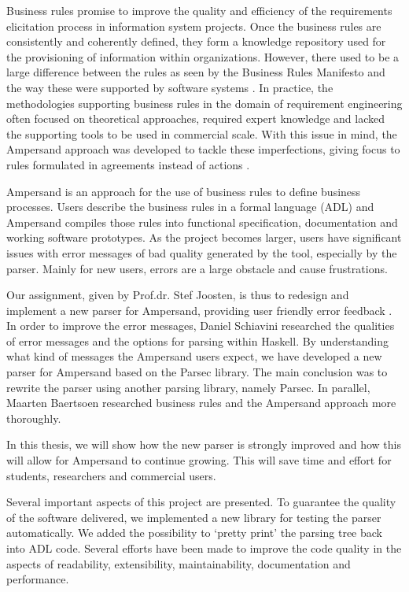 
Business rules promise to improve the quality and efficiency of the requirements elicitation process in information system projects.
Once the business rules are consistently and coherently defined, they form a knowledge repository used for the provisioning of information within organizations.
However, there used to be a large difference between the rules as seen by the Business Rules Manifesto and the way these were supported by software systems .
In practice, the methodologies supporting business rules in the domain of requirement engineering often focused on theoretical approaches, required expert knowledge and lacked the supporting tools to be used in commercial scale.
With this issue in mind, the Ampersand approach was developed to tackle these imperfections, giving focus to rules formulated in agreements instead of actions .

Ampersand is an approach for the use of business rules to define business processes.
Users describe the business rules in a formal language (ADL) and Ampersand compiles those rules into functional specification, documentation and working software prototypes.
As the project becomes larger, users have significant issues with error messages of bad quality generated by the tool, especially by the parser.
Mainly for new users, errors are a large obstacle and cause frustrations.

Our assignment, given by Prof.dr. Stef Joosten, is thus to redesign and implement a new parser for Ampersand, providing user friendly error feedback .
In order to improve the error messages, Daniel Schiavini researched the qualities of error messages and the options for parsing within Haskell.
By understanding what kind of messages the Ampersand users expect, we have developed a new parser for Ampersand based on the Parsec library.
The main conclusion was to rewrite the parser using another parsing library, namely Parsec.
In parallel, Maarten Baertsoen researched business rules and the Ampersand approach more thoroughly.

In this thesis, we will show how the new parser is strongly improved and how this will allow for Ampersand to continue growing.
This will save time and effort for students, researchers and commercial users.

Several  important aspects of this project are presented.
To guarantee the quality of the software delivered, we implemented a new library for testing the parser automatically.
We added the possibility to `pretty print' the parsing tree back into ADL code.
Several efforts have been made to improve the code quality in the aspects of readability, extensibility, maintainability, documentation and performance.

